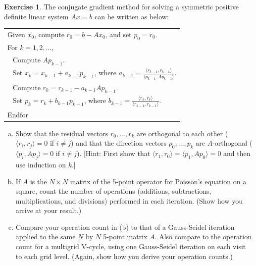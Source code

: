 \documentclass[12pt]{article}
\theoremstyle{definition}
\newtheorem{exer}{Exercise}
\theoremstyle{remark}
\begin{document}
\begin{exer}
The conjugate gradient method for solving a symmetric positive definite linear system
$Ax=b$ can be written as below:
\vspace{.1in}

\begin{center}
\begin{tabular}{|l|} \hline
Given $x_0$, compute $r_0 = b - A x_0$, and set $p_0 = r_0$. \\
For $k=1,2, \ldots$, \\
$~~$ Compute $A p_{k-1}$. \\
$~~$ Set $x_k = x_{k-1} + a_{k-1} p_{k-1}$, where $a_{k-1} = \frac{\langle r_{k-1} , r_{k-1} \rangle}
{\langle p_{k-1} , A p_{k-1} \rangle}$. \\
$~~$ Compute $r_k = r_{k-1} - a_{k-1} A p_{k-1}$. \\
$~~$ Set $p_k = r_k + b_{k-1} p_{k-1}$, where $b_{k-1} = \frac{\langle r_k , r_k \rangle}
{\langle r_{k-1} , r_{k-1} \rangle}$. \\
Endfor \\ \hline
\end{tabular}
\end{center}
\vspace{.1in}

\begin{enumerate}[(a)]
\item
Show that the residual vectors $r_0 , \ldots , r_k$ are orthogonal to each other
($\langle r_i , r_j \rangle = 0$ if $i \neq j$) and that the direction vectors 
$p_0 , \ldots , p_k$ are $A$-orthogonal ($\langle p_i , A p_j \rangle = 0$ if $i \neq j$).
[Hint:  First show that $\langle r_1 , r_0 \rangle = \langle p_1 , A p_0 \rangle = 0$
and then use induction on $k$.]

\item
If $A$ is the $N \times N$ matrix of the 5-point operator for Poisson's equation on a square,
count the number of operations (additions, subtractions, multiplications, and divisions) performed
in each iteration.  (Show how you arrive at your result.)

\item
Compare your operation count in (b) to that of a Gauss-Seidel iteration applied to the
same $N$ by $N$ 5-point matrix $A$.  Also compare to the operation count for a multigrid 
V-cycle, using one Gauss-Seidel iteration on each visit to each grid level.
(Again, show how you derive your operation counts.)
\end{enumerate}
\end{exer}
\end{document}
